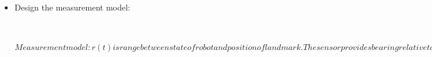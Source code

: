 \documentclass{article}
\begin{document}
\begin{itemize}
	\item{Design the measurement model:} 
	\begin{itemize}

		\begin{subequations}
		Measurement model:
		r(t) is range between state of robot and position of landmark. The sensor provides bearing relative to the orientation of the robot, we subtract the robot's orientation from the bearing to get the sensor reading b(t)
		\begin{align}
			z_t = h\left({x_t}\right)+ \delta_t 	\\		
			r_t = \sqrt{{\left(x_t - x_L\right)}^2 + {\left(y_t - y_L\right)}^2}\\
			b_t = \arctan{\dfrac{y_t - y_L}{x_t - x_L}} + \varphi_t
		\end{align}
		\end{subequations}
		\end{itemize}
\end{itemize}


%

\pagebreak
\end{document}
